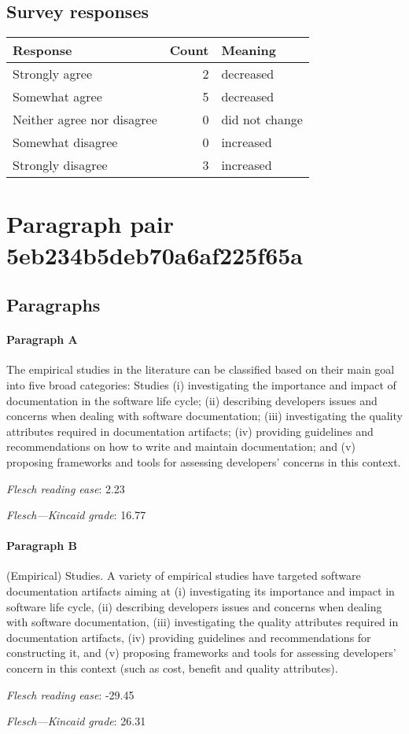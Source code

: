\subsection{Survey responses}
\begin{tabular}{lrl}
\toprule
          \textbf{Response} &  \textbf{Count} & \textbf{Meaning} \\
\midrule
             Strongly agree &               2 &        decreased \\
             Somewhat agree &               5 &        decreased \\
 Neither agree nor disagree &               0 &   did not change \\
          Somewhat disagree &               0 &        increased \\
          Strongly disagree &               3 &        increased \\
\bottomrule
\end{tabular}

\section{Paragraph pair 5eb234b5deb70a6af225f65a}
\subsection{Paragraphs}
\paragraph{Paragraph A}
The empirical studies in the literature can be classified based on their main goal into five broad categories: Studies (i) investigating the importance and impact of documentation in the software life cycle; (ii) describing developers issues and concerns when dealing with software documentation; (iii) investigating the quality attributes required in documentation artifacts; (iv) providing guidelines and recommendations on how to write and maintain documentation; and (v) proposing frameworks and tools for assessing developers' concerns in this context.\par\medskip
\emph{Flesch reading ease}: 2.23\par
\emph{Flesch---Kincaid grade}: 16.77

\paragraph{Paragraph B}
(Empirical) Studies. A variety of empirical studies have targeted software documentation artifacts aiming at (i) investigating its importance and impact in software life cycle, (ii) describing developers issues and concerns when dealing with software documentation, (iii) investigating the quality attributes required in documentation artifacts, (iv) providing guidelines and recommendations for constructing it, and (v) proposing frameworks and tools for assessing developers' concern in this context (such as cost, benefit and quality attributes).\par\medskip
\emph{Flesch reading ease}: -29.45\par
\emph{Flesch---Kincaid grade}: 26.31

